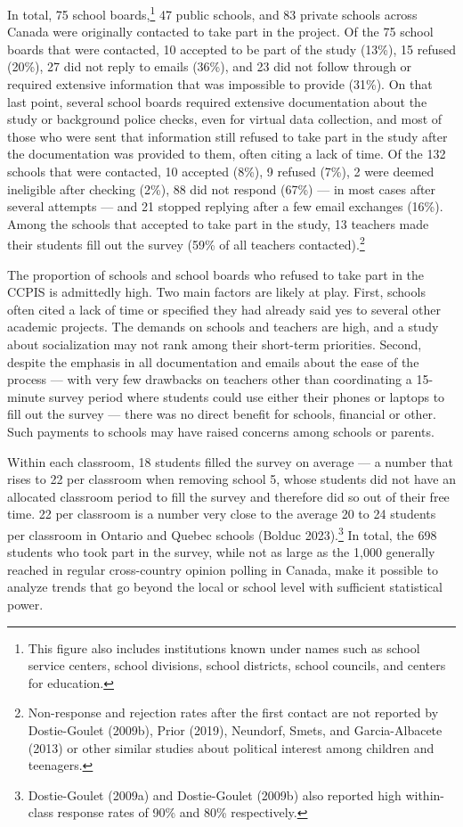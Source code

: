 \documentclass[
  letterpaper,
  DIV=11,
  numbers=noendperiod]{scrreprt}
\begin{document}
In total, 75 school boards,\footnote{This figure also includes
  institutions known under names such as school service centers, school
  divisions, school districts, school councils, and centers for
  education.} 47 public schools, and 83 private schools across Canada
were originally contacted to take part in the project. Of the 75 school
boards that were contacted, 10 accepted to be part of the study (13\%),
15 refused (20\%), 27 did not reply to emails (36\%), and 23 did not
follow through or required extensive information that was impossible to
provide (31\%). On that last point, several school boards required
extensive documentation about the study or background police checks,
even for virtual data collection, and most of those who were sent that
information still refused to take part in the study after the
documentation was provided to them, often citing a lack of time. Of the
132 schools that were contacted, 10 accepted (8\%), 9 refused (7\%), 2
were deemed ineligible after checking (2\%), 88 did not respond (67\%)
--- in most cases after several attempts --- and 21 stopped replying
after a few email exchanges (16\%). Among the schools that accepted to
take part in the study, 13 teachers made their students fill out the
survey (59\% of all teachers contacted).\footnote{Non-response and
  rejection rates after the first contact are not reported by
  Dostie-Goulet (2009b), Prior (2019), Neundorf, Smets, and
  Garcia-Albacete (2013) or other similar studies about political
  interest among children and teenagers.}

The proportion of schools and school boards who refused to take part in
the CCPIS is admittedly high. Two main factors are likely at play.
First, schools often cited a lack of time or specified they had already
said yes to several other academic projects. The demands on schools and
teachers are high, and a study about socialization may not rank among
their short-term priorities. Second, despite the emphasis in all
documentation and emails about the ease of the process --- with very few
drawbacks on teachers other than coordinating a 15-minute survey period
where students could use either their phones or laptops to fill out the
survey --- there was no direct benefit for schools, financial or other.
Such payments to schools may have raised concerns among schools or
parents.

Within each classroom, 18 students filled the survey on average --- a
number that rises to 22 per classroom when removing school 5, whose
students did not have an allocated classroom period to fill the survey
and therefore did so out of their free time. 22 per classroom is a
number very close to the average 20 to 24 students per classroom in
Ontario and Quebec schools (Bolduc 2023).\footnote{Dostie-Goulet (2009a)
  and Dostie-Goulet (2009b) also reported high within-class response
  rates of 90\% and 80\% respectively.} In total, the 698 students who
took part in the survey, while not as large as the 1,000 generally
reached in regular cross-country opinion polling in Canada, make it
possible to analyze trends that go beyond the local or school level with
sufficient statistical power.
\end{document}
